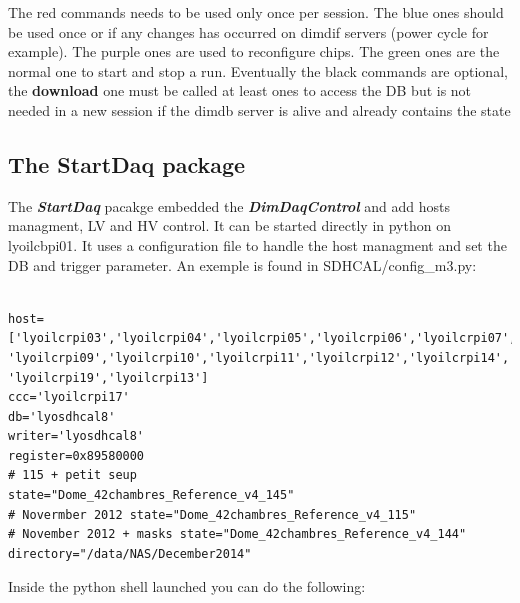 \documentclass[english]{article}
\begin{document}
The red commands needs to be used only once per session. The blue ones should be used once or if any changes has occurred on dimdif servers (power cycle for example). The purple ones are used to reconfigure chips. The green ones are the normal one to start and stop a run. Eventually the black commands are optional, the {\bf download} one must be called at least ones to access the DB but is not needed in a new session if the dimdb server is alive and already contains the state 

\subsection{ The StartDaq package }
The {\bf \sl StartDaq} pacakge embedded the { \bf \sl DimDaqControl }  and add hosts managment, LV and HV control. It can be started directly in python on lyoilcbpi01. It uses a configuration file to handle the host managment and set the DB and trigger parameter. An exemple is found in SDHCAL/config\_m3.py:

\begin{verbatim}

host=['lyoilcrpi03','lyoilcrpi04','lyoilcrpi05','lyoilcrpi06','lyoilcrpi07','lyoilcrpi08',
'lyoilcrpi09','lyoilcrpi10','lyoilcrpi11','lyoilcrpi12','lyoilcrpi14','lyoilcrpi15',
'lyoilcrpi19','lyoilcrpi13']
ccc='lyoilcrpi17'
db='lyosdhcal8'
writer='lyosdhcal8'
register=0x89580000
# 115 + petit seup
state="Dome_42chambres_Reference_v4_145"
# Novermber 2012 state="Dome_42chambres_Reference_v4_115"
# November 2012 + masks state="Dome_42chambres_Reference_v4_144"
directory="/data/NAS/December2014"

\end{verbatim}


Inside the python shell launched you can do the following:
\end{document}
